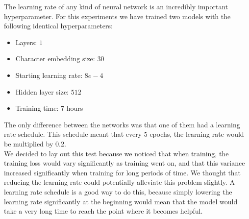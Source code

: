 The learning rate of any kind of neural network is an incredibly important hyperparameter. For this experiments we have trained two models with the following identical hyperparameters:
\begin{itemize}
	\item Layers: $1$
	\item Character embedding size: 30
	\item Starting learning rate: $8e-4$
	\item Hidden layer size: $512$
	\item Training time: 7 hours
\end{itemize}
The only difference between the networks was that one of them had a learning rate schedule. This schedule meant that every $5$ epochs, the learning rate would be multiplied by $0.2$. \\

\noindent
We decided to lay out this test because we noticed that when training, the training loss would vary significantly as training went on, and that this variance increased significantly when training for long periods of time. We thought that reducing the learning rate could potentially alleviate this problem slightly. A learning rate schedule is a good way to do this, because simply lowering the learning rate significantly at the beginning would mean that the model would take a very long time to reach the point where it becomes helpful.